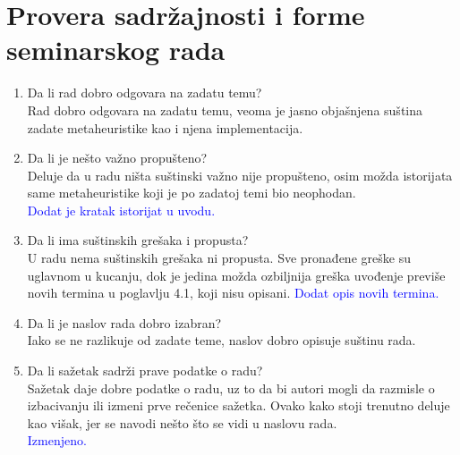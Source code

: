 \documentclass[a4paper]{report}
\newcommand{\odgovor}[1]{\textcolor{blue}{#1}}
\begin{document}
\section{Provera sadržajnosti i forme seminarskog rada}

\begin{enumerate}
\item Da li rad dobro odgovara na zadatu temu?\\
Rad dobro odgovara na zadatu temu, veoma je jasno objašnjena suština zadate metaheuristike kao i njena implementacija.

\item Da li je nešto važno propušteno?\\
Deluje da u radu ništa suštinski važno nije propušteno, osim možda istorijata same metaheuristike koji je po zadatoj temi bio neophodan.\\
\odgovor{Dodat je kratak istorijat u uvodu.\\}

\item Da li ima suštinskih grešaka i propusta?\\
U radu nema suštinskih grešaka ni propusta. Sve pronađene greške su uglavnom u kucanju, dok je jedina možda ozbiljnija greška uvođenje previše novih termina u poglavlju 4.1, koji nisu opisani.
\odgovor{Dodat opis novih termina.\\}
\item Da li je naslov rada dobro izabran?\\
Iako se ne razlikuje od zadate teme, naslov dobro opisuje suštinu rada.

\item Da li sažetak sadrži prave podatke o radu?\\
Sažetak daje dobre podatke o radu, uz to da bi autori mogli da razmisle o izbacivanju ili izmeni prve rečenice sažetka. Ovako kako stoji trenutno deluje kao višak, jer se navodi nešto što se vidi u naslovu rada.\\
\odgovor{Izmenjeno.\\} 


\end{enumerate}
\end{document}
